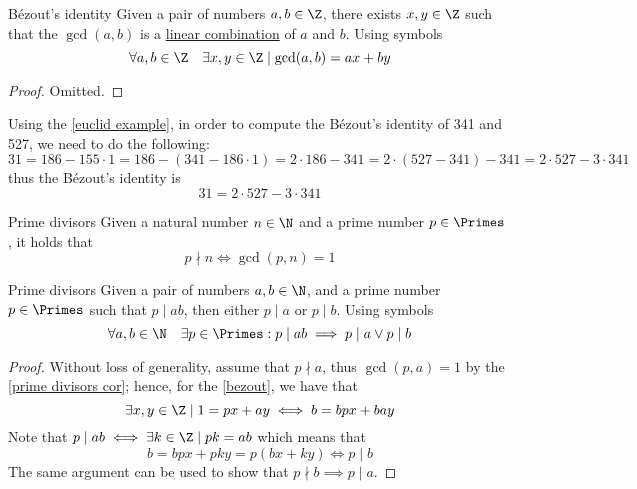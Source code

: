 \documentclass[a4paper, 12pt]{report}
\begin{document}
    \begin{framedlem}[label={bezout}]{Bézout's identity}
        Given a pair of numbers $a, b \in \Z$, there exists $x, y \in \Z$ such that the $\gcd(a, b)$ is a \href{https://en.wikipedia.org/wiki/Linear_combination}{linear combination} of $a$ and $b$. Using symbols $$\forall a, b \in \Z \quad \exists x, y \in \Z \mid \gcd(a, b) = ax + by$$
    \end{framedlem}

    \begin{proof}
        Omitted.
    \end{proof}

    \begin{example}
        Using the \cref{euclid example}, in order to compute the Bézout's identity of 341 and 527, we need to do the following: $$31 = 186 - 155 \cdot 1 = 186 - (341 - 186 \cdot 1) = 2 \cdot 186 - 341 = 2 \cdot (527 - 341) - 341 = 2 \cdot 527 - 3 \cdot 341$$ thus the Bézout's identity is $$31 = 2 \cdot 527 - 3\cdot 341$$
    \end{example}

    \begin{framedcor}[label={prime divisors cor}]{Prime divisors}
        Given a natural number $n \in \N$ and a prime number $p \in \Primes$ , it holds that $$p \nmid n \iff \gcd(p, n) = 1$$
    \end{framedcor}


    \begin{framedlem}{Prime divisors}
        Given a pair of numbers $a, b \in \N$, and a prime number $p \in \Primes$ such that $p \mid ab$, then either $p \mid a$ or $p \mid b$. Using symbols $$\forall a, b \in \N \quad \exists p \in \Primes : p \mid ab \implies p \mid a \lor p \mid b$$
    \end{framedlem}

    \begin{proof}
        Without loss of generality, assume that $p \nmid a$, thus $\gcd(p, a) = 1$ by the \cref{prime divisors cor}; hence, for the \cref{bezout}, we have that $$\exists x, y \in \Z \mid 1 = px + ay \iff b = bpx + bay$$ Note that $p \mid ab \iff \exists k \in \Z \mid pk = ab$ which means that $$b = bpx + pky = p(bx+ky) \iff p \mid b$$ The same argument can be used to show that $p \nmid b \implies p \mid a$.
    \end{proof}
\end{document}
